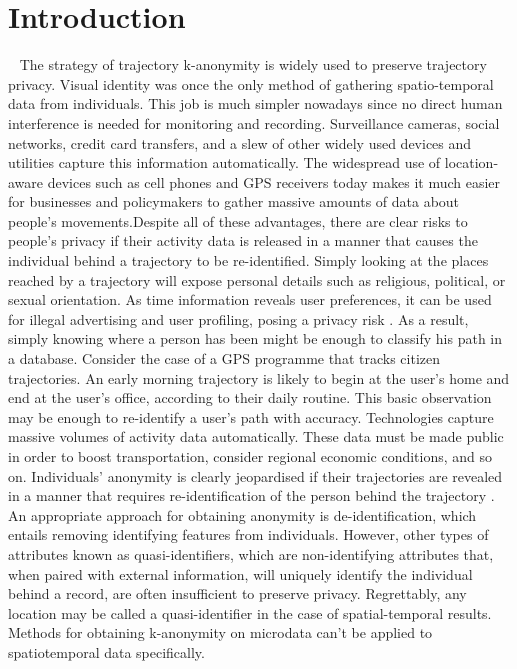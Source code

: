 \section{Introduction}~\label{sec:introduction}
The strategy of trajectory k-anonymity is widely used to preserve trajectory privacy. Visual identity was once the only method of gathering spatio-temporal data from individuals. This job is much simpler nowadays since no direct human interference is needed for monitoring and recording. Surveillance cameras, social networks, credit card transfers, and a slew of other widely used devices and utilities capture this information automatically. The widespread use of location-aware devices such as cell phones and GPS receivers today makes it much easier for businesses and policymakers to gather massive amounts of data about people's movements.Despite all of these advantages, there are clear risks to people's privacy if their activity data is released in a manner that causes the individual behind a trajectory to be re-identified. Simply looking at the places reached by a trajectory will expose personal details such as religious, political, or sexual orientation. As time information reveals user preferences, it can be used for illegal advertising and user profiling, posing a privacy risk \cite{yarovoy2009anonymizing}. As a result, simply knowing where a person has been might be enough to classify his path in a database. Consider the case of a GPS programme that tracks citizen trajectories. An early morning trajectory is likely to begin at the user's home and end at the user's office, according to their daily routine. This basic observation may be enough to re-identify a user's path with accuracy. Technologies capture massive volumes of activity data automatically. These data must be made public in order to boost transportation, consider regional economic conditions, and so on. Individuals' anonymity is clearly jeopardised if their trajectories are revealed in a manner that requires re-identification of the person behind the trajectory \cite{domingo2010privacy}. An appropriate approach for obtaining anonymity is de-identification, which entails removing identifying features from individuals. However, other types of attributes known as quasi-identifiers, which are non-identifying attributes that, when paired with external information, will uniquely identify the individual behind a record, are often insufficient to preserve privacy. Regrettably, any location may be called a quasi-identifier in the case of spatial-temporal results. Methods for obtaining k-anonymity on microdata can't be applied to spatiotemporal data specifically. \cite{sweeney2002k}\\
